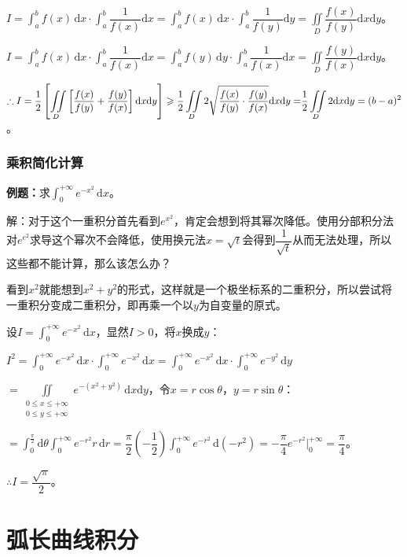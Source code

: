 \documentclass[UTF8, 12pt]{ctexart}
\begin{document}
$I=\displaystyle{\int_a^bf(x)\,\textrm{d}x\cdot\int_a^b\dfrac{1}{f(x)}\textrm{d}x}=\int_a^bf(x)\,\textrm{d}x\cdot\int_a^b\dfrac{1}{f(y)}\textrm{d}y=\iint\limits_D\dfrac{f(x)}{f(y)}\textrm{d}x\textrm{d}y$。

$I=\displaystyle{\int_a^bf(x)\,\textrm{d}x\cdot\int_a^b\dfrac{1}{f(x)}\textrm{d}x}=\int_a^bf(y)\,\textrm{d}y\cdot\int_a^b\dfrac{1}{f(x)}\textrm{d}x=\iint\limits_D\dfrac{f(y)}{f(x)}\textrm{d}x\textrm{d}y$。

$\therefore I=\displaystyle{\dfrac{1}{2}\left[\iint\limits_D\left[\dfrac{f(x)}{f(y)}+\dfrac{f(y)}{f(x)}\right]\textrm{d}x\textrm{d}y\right]\geqslant\dfrac{1}{2}\iint\limits_D2\sqrt{\dfrac{f(x)}{f(y)}\cdot\dfrac{f(y)}{f(x)}}\textrm{d}x\textrm{d}y=}\\\displaystyle{\dfrac{1}{2}\iint\limits_D2\textrm{d}x\textrm{d}y}=(b-a)^2$。

\subsubsection{乘积简化计算}

\textbf{例题：}求$\int_0^{+\infty}e^{-x^2}\,\textrm{d}x$。

解：对于这个一重积分首先看到$e^{x^2}$，肯定会想到将其幂次降低。使用分部积分法对$e^{e^2}$求导这个幂次不会降低，使用换元法$x=\sqrt{t}$会得到$\dfrac{1}{\sqrt{t}}$从而无法处理，所以这些都不能计算，那么该怎么办？

看到$x^2$就能想到$x^2+y^2$的形式，这样就是一个极坐标系的二重积分，所以尝试将一重积分变成二重积分，即再乘一个以$y$为自变量的原式。

设$I=\int_0^{+\infty}e^{-x^2}\,\textrm{d}x$，显然$I>0$，将$x$换成$y$：

$I^2=\int_0^{+\infty}e^{-x^2}\,\textrm{d}x\cdot\int_0^{+\infty}e^{-x^2}\,\textrm{d}x=\int_0^{+\infty}e^{-x^2}\,\textrm{d}x\cdot\int_0^{+\infty}e^{-y^2}\,\textrm{d}y$

$=\displaystyle{\iint\limits_{\substack{0\leqslant x\leqslant+\infty\\0\leqslant y\leqslant+\infty}}e^{-(x^2+y^2)}\,\textrm{d}x\textrm{d}y}$，令$x=r\cos\theta$，$y=r\sin\theta$：

$=\displaystyle{\int_0^\frac{\pi}{2}\textrm{d}\theta\int_0^{+\infty}e^{-r^2}r\,\textrm{d}r=\dfrac{\pi}{2}\left(-\dfrac{1}{2}\right)\int_0^{+\infty}e^{-r^2}\,\textrm{d}(-r^2)=-\dfrac{\pi}{4}e^{-r^2}\bigg\vert_0^{+\infty}}=\dfrac{\pi}{4}$。

$\therefore I=\dfrac{\sqrt{\pi}}{2}$。

\section{弧长曲线积分}
\end{document}
